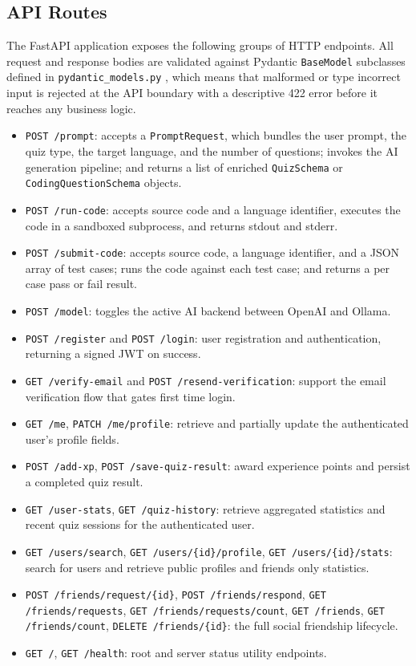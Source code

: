 \subsection{API Routes}

The FastAPI application exposes the following groups of HTTP endpoints.
All request and response bodies are validated against Pydantic
\texttt{BaseModel} subclasses defined in \texttt{pydantic\_models.py}
\cite{pydantic2025}, which means that malformed or type incorrect input
is rejected at the API boundary with a descriptive 422 error before it
reaches any business logic.

\begin{itemize}
    \item \texttt{POST /prompt}: accepts a \texttt{PromptRequest}, which
    bundles the user prompt, the quiz type, the target language, and the
    number of questions; invokes the AI generation pipeline; and returns
    a list of enriched \texttt{QuizSchema} or
    \texttt{CodingQuestionSchema} objects.
    \item \texttt{POST /run-code}: accepts source code and a language
    identifier, executes the code in a sandboxed subprocess, and returns
    stdout and stderr.
    \item \texttt{POST /submit-code}: accepts source code, a language
    identifier, and a JSON array of test cases; runs the code against
    each test case; and returns a per case pass or fail result.
    \item \texttt{POST /model}: toggles the active AI backend between
    OpenAI and Ollama.
    \item \texttt{POST /register} and \texttt{POST /login}: user
    registration and authentication, returning a signed JWT on success.
    \item \texttt{GET /verify-email} and \texttt{POST /resend-verification}:
    support the email verification flow that gates first time login.
    \item \texttt{GET /me}, \texttt{PATCH /me/profile}: retrieve and
    partially update the authenticated user's profile fields.
    \item \texttt{POST /add-xp}, \texttt{POST /save-quiz-result}: award
    experience points and persist a completed quiz result.
    \item \texttt{GET /user-stats}, \texttt{GET /quiz-history}: retrieve
    aggregated statistics and recent quiz sessions for the authenticated
    user.
    \item \texttt{GET /users/search}, \texttt{GET /users/\{id\}/profile},
    \texttt{GET /users/\{id\}/stats}: search for users and retrieve public
    profiles and friends only statistics.
    \item \texttt{POST /friends/request/\{id\}},
    \texttt{POST /friends/respond},
    \texttt{GET /friends/requests},
    \texttt{GET /friends/requests/count},
    \texttt{GET /friends},
    \texttt{GET /friends/count},
    \texttt{DELETE /friends/\{id\}}: the full social friendship lifecycle.
    \item \texttt{GET /}, \texttt{GET /health}: root and server status
    utility endpoints.
\end{itemize}

